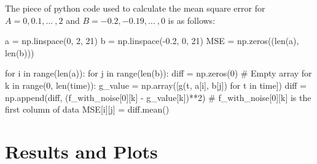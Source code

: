 \documentclass[12pt, a4paper]{report}
\begin{document}
The piece of python code used to calculate the mean square error
for $A=0,0.1,\ldots\ ,2$ and $B=-0.2,-0.19,\ldots\ ,0$ is as follows:

\begin{py_code}
    a = np.linspace(0, 2, 21)
    b = np.linspace(-0.2, 0, 21)
    MSE = np.zeros((len(a), len(b)))
    
    for i in range(len(a)):
        for j in range(len(b)):
            diff = np.zeros(0)      # Empty array
            for k in range(0, len(time)):
                g_value = np.array([g(t, a[i], b[j]) for t in time])
                diff = np.append(diff, (f_with_noise[0][k] - g_value[k])**2)     # f_with_noise[0][k] is the first column of data
            MSE[i][j] = diff.mean()
\end{py_code}

\section*{Results and Plots}
\end{document}
